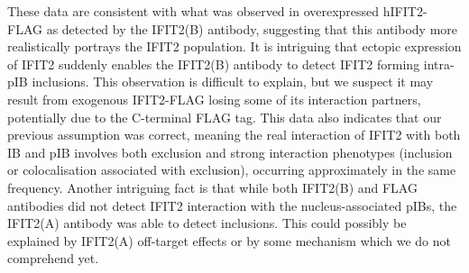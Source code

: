 These data are consistent with what was observed in overexpressed hIFIT2-FLAG as detected by the IFIT2(B) antibody, suggesting that this antibody more realistically portrays the IFIT2 population. It is intriguing that ectopic expression of IFIT2 suddenly enables the IFIT2(B) antibody to detect IFIT2 forming intra-pIB inclusions. This observation is difficult to explain, but we suspect it may result from exogenous IFIT2-FLAG losing some of its interaction partners, potentially due to the C-terminal FLAG tag. This data also indicates that our previous assumption was correct, meaning the real interaction of IFIT2 with both IB and pIB involves both exclusion and strong interaction phenotypes (inclusion or colocalisation associated with exclusion), occurring approximately in the same frequency. Another intriguing fact is that while both IFIT2(B) and FLAG antibodies did not detect IFIT2 interaction with the nucleus-associated pIBs, the IFIT2(A) antibody was able to detect inclusions. This could possibly be explained by IFIT2(A) off-target effects or by some mechanism which we do not comprehend yet.

